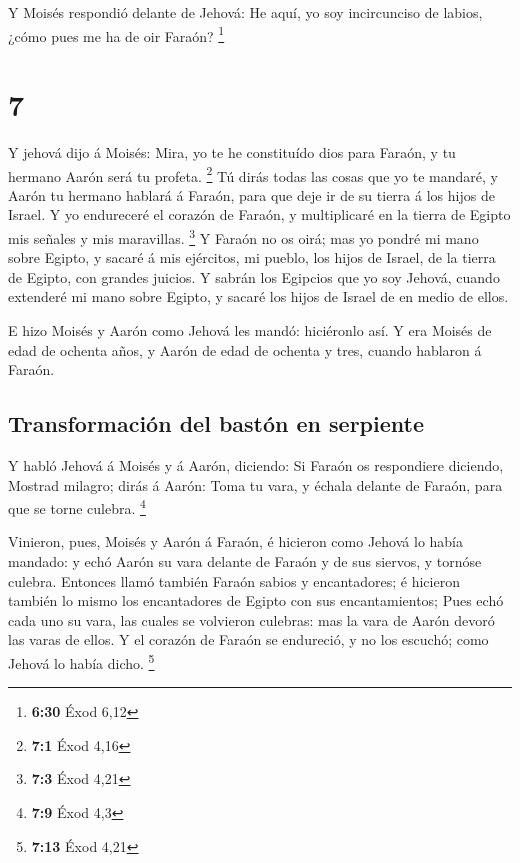 Y Moisés respondió delante de Jehová: He aquí, yo soy
incircunciso de labios, ¿cómo pues me ha de oir Faraón? \footnote{\textbf{6:30}
  Éxod 6,12}

\hypertarget{section-6}{%
\section{7}\label{section-6}}

 Y jehová dijo á Moisés: Mira, yo te he constituído dios
para Faraón, y tu hermano Aarón será tu profeta. \footnote{\textbf{7:1}
  Éxod 4,16}  Tú dirás todas las cosas que yo te mandaré, y
Aarón tu hermano hablará á Faraón, para que deje ir de su tierra á los
hijos de Israel.  Y yo endureceré el corazón de Faraón, y
multiplicaré en la tierra de Egipto mis señales y mis maravillas.
\footnote{\textbf{7:3} Éxod 4,21}  Y Faraón no os oirá; mas
yo pondré mi mano sobre Egipto, y sacaré á mis ejércitos, mi pueblo, los
hijos de Israel, de la tierra de Egipto, con grandes juicios.
 Y sabrán los Egipcios que yo soy Jehová, cuando extenderé
mi mano sobre Egipto, y sacaré los hijos de Israel de en medio de ellos.

 E hizo Moisés y Aarón como Jehová les mandó: hiciéronlo
así.  Y era Moisés de edad de ochenta años, y Aarón de edad
de ochenta y tres, cuando hablaron á Faraón.

\hypertarget{transformaciuxf3n-del-bastuxf3n-en-serpiente}{%
\subsection{Transformación del bastón en
serpiente}\label{transformaciuxf3n-del-bastuxf3n-en-serpiente}}

 Y habló Jehová á Moisés y á Aarón, diciendo: 
Si Faraón os respondiere diciendo, Mostrad milagro; dirás á Aarón: Toma
tu vara, y échala delante de Faraón, para que se torne culebra.
\footnote{\textbf{7:9} Éxod 4,3}

 Vinieron, pues, Moisés y Aarón á Faraón, é hicieron como
Jehová lo había mandado: y echó Aarón su vara delante de Faraón y de sus
siervos, y tornóse culebra.  Entonces llamó también Faraón
sabios y encantadores; é hicieron también lo mismo los encantadores de
Egipto con sus encantamientos;  Pues echó cada uno su vara,
las cuales se volvieron culebras: mas la vara de Aarón devoró las varas
de ellos.  Y el corazón de Faraón se endureció, y no los
escuchó; como Jehová lo había dicho. \footnote{\textbf{7:13} Éxod 4,21}

